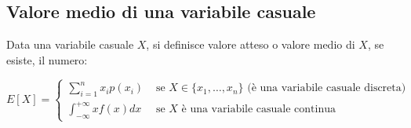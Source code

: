 \documentclass{subfiles}
\begin{document}
\subsection{Valore medio di una variabile casuale}

Data una variabile casuale $X$, si definisce valore atteso o valore medio di $X$, se esiste, il numero:

$$
E[X] =
\begin{cases}
\sum^n_{i=1} x_i p(x_i) & \text{ se $X \in \{x_1, \dots, x_n\}$ (è una variabile casuale discreta)} \\
\int^{+\infty}_{-\infty} x f(x) dx & \text{ se $X$ è una variabile casuale continua}
\end{cases}
$$
\end{document}
